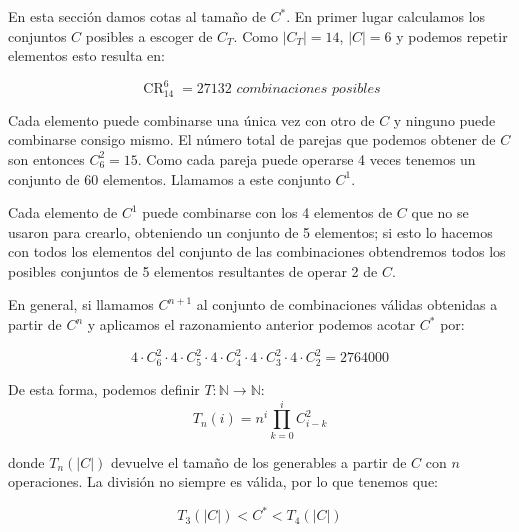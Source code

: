 En esta sección damos cotas al tamaño de $C^{\ast}$. En primer lugar calculamos
los conjuntos $C$ posibles a escoger de $C_T$. Como $|C_T| = 14$, $|C| = 6$ y
podemos repetir elementos esto resulta en:

\[\operatorname{CR}_{14}^{6} = 27132 \textit{ combinaciones posibles}\]

Cada elemento puede combinarse una única vez con otro de $C$
y ninguno puede combinarse consigo mismo. El número total de parejas que podemos
obtener de $C$ son entonces $C_{6}^{2}=15$.
Como cada pareja puede operarse 4 veces tenemos un conjunto de 60 elementos.
Llamamos a este conjunto $C^1$.

Cada elemento de $C^1$ puede combinarse con los 4 elementos de $C$ que no se
usaron para crearlo, obteniendo un conjunto de 5 elementos;
si esto lo hacemos con todos los elementos del conjunto de las combinaciones
obtendremos todos los posibles conjuntos de 5 elementos resultantes de operar
2 de $C$.

En general, si llamamos $C^{n+1}$ al conjunto de combinaciones válidas obtenidas
a partir de $C^n$ y aplicamos el razonamiento anterior podemos acotar $C^{\ast}$
por:

\[ 4 \cdot C_6^2 \cdot 4 \cdot C_5^2 \cdot 4 \cdot C_4^2 \cdot 4 \cdot C_3^2 \cdot 4 \cdot C_2^2= 2764000\]

De esta forma, podemos definir $T:\mathbb{N} \to \mathbb{N}$:
\[T_n(i)=n^i\prod_{k=0}^{i}C_{i-k}^{2}\]

donde $T_n(|C|)$ devuelve el tamaño de los generables a partir de $C$ con $n$
operaciones. La división no siempre es válida, por lo que tenemos que:

\[T_3(|C|) < C^{\ast} < T_4(|C|)\]
